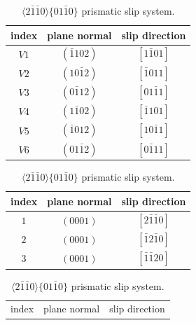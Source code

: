 \begin{table}[H]

    \begin{minipage}[h]{0.45\textwidth}
    \begin{subtable}{\textwidth}
    \centering
    \caption{$\langle \Bar{1} 0 1 1 \rangle \{ 1 0 \Bar{1} 2 \}$ extension twin system.}
    \label{tab:Twins1}
        \begin{tabular}{ccc}
            \hline
            index & plane normal & slip direction \\
            \hline
            $V1$ & $(\bar{1} 1 0 2)$ & $[ 1 \bar{1} 0 1]$ \\
            $V2$ & $(1 0 \bar{1} 2)$ & $[ \bar{1} 0 1 1]$ \\
            $V3$ & $(0 \bar{1} 1 2)$ & $[ 0 1 \bar{1} 1]$ \\
            $V4$ & $(1 \bar{1} 0 2)$ & $[ \bar{1} 1 0 1]$ \\
            $V5$ & $(\bar{1} 0 1 2)$ & $[ 1 0 \bar{1} 1]$ \\
            $V6$ & $(0 1 \bar{1} 2)$ & $[ 0 \bar{1} 1 1]$ \\
            \hline
        \end{tabular}
    \end{subtable} 
    \begin{subtable}{\textwidth}
    \centering
    \caption{$\langle 2 \bar{1} \bar{1} 0 \rangle \{ 0 0  0 1 \}$ basal slip system.}
    \label{tab:Slips0}
        \begin{tabular}{ccc}
            \hline
            index & plane normal & slip direction \\
            \hline
            $1$ & $(0 0 0 1)$ & $[ 2 \bar{1} \bar{1} 0]$ \\
            $2$ & $(0 0 0 1)$ & $[ \bar{1} 2 \bar{1} 0]$ \\
            $3$ & $(0 0 0 1)$ & $[ \bar{1} \bar{1} 2 0]$ \\
            \hline
        \end{tabular}
    \end{subtable} 
    \begin{subtable}{\textwidth}
    \centering
    \caption{$\langle 2 \bar{1} \bar{1} 0 \rangle \{ 0 1 \bar{1} 0 \}$ prismatic slip system.}
    \label{tab:Slips1}
        \begin{tabular}{ccc}
            \hline
            index & plane normal & slip direction \\

\end{tabular}
\end{subtable}
\end{minipage}
\end{table}
